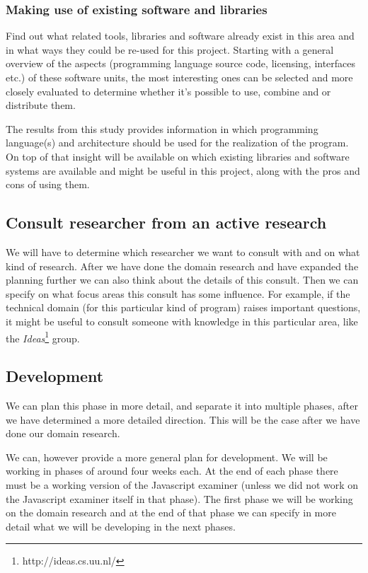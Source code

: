 \documentclass{article}
\begin{document}
\subsubsection{Making use of existing software and libraries}
Find out what related tools, libraries and software already exist in this area
and in what ways they could be re-used for this project. Starting with a
general overview of the aspects (programming language source code, licensing,
interfaces etc.) of these software units, the most interesting ones can be
selected and more closely evaluated to determine whether it's possible to use,
combine and or distribute them.

The results from this study provides information in which programming
language(s) and architecture should be used for the realization of the
program. On top of that insight will be available on which existing libraries
and software systems are available and might be useful in this project, along
with the pros and cons of using them.

\subsection{Consult researcher from an active research}
We will have to determine which researcher we want to consult with and on what
kind of research. After we have done the domain research and have expanded the
planning further we can also think about the details of this consult. Then we
can specify on what focus areas this consult has some influence. For example,
if the technical domain (for this particular kind of program) raises important
questions, it might be useful to consult someone with knowledge in this
particular area, like the {\em Ideas}\footnote{http://ideas.cs.uu.nl/} group.

\subsection{Development}
We can plan this phase in more detail, and separate it into multiple phases,
after we have determined a more detailed direction. This will be the case after
we have done our domain research.

We can, however provide a more general plan for development. We will be working
in phases of around four weeks each. At the end of each phase there must be a
working version of the Javascript examiner (unless we did not work on the
Javascript examiner itself in that phase). The first phase we will be working
on the domain research and at the end of that phase we can specify in more
detail what we will be developing in the next phases.
\end{document}
